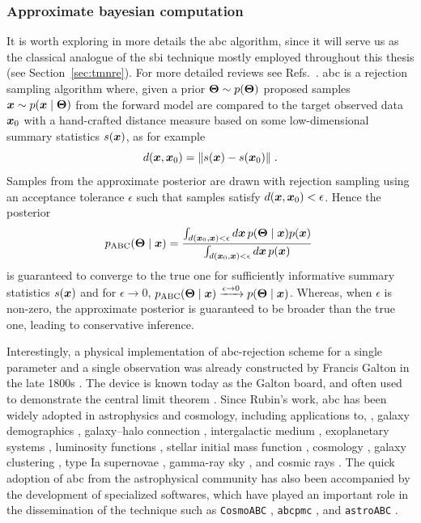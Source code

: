 \subsubsection{Approximate bayesian computation}

It is worth exploring in more details the \gls*{abc} algorithm, since it will serve us as the classical analogue of the \gls*{sbi} technique mostly employed throughout this thesis (see Section~\ref{sec:tmnre}). For more detailed reviews see Refs.~\cite{marin2012approximate, Sisson:2018aa, Grazian:2019aa}. \Gls*{abc} is a rejection sampling algorithm where, given a prior $\bm{\Theta}\sim p(\bm{\Theta})$ proposed samples $\bm{x} \sim p(\bm{x}\mid\bm{\Theta})$ from the forward model are compared to the target observed data $\bm{x}_0$ with a hand-crafted distance measure based on some low-dimensional summary statistics $s(\bm{x})$, as for example
\begin{equation}
    d(\bm{x}, \bm{x}_0)  = \| s(\bm{x}) - s(\bm{x}_0)\|\;.
\end{equation}
Samples from the approximate posterior are drawn with rejection sampling using an acceptance tolerance $\epsilon$ such that samples satisfy $d(\bm{x}, \bm{x}_0) < \epsilon$.
Hence the posterior
\begin{equation}
    p_\text{ABC}(\bm{\Theta}\mid\bm{x}) = \frac
    {\int_{d(\bm{x}_0, \bm{x}) < \epsilon} d\bm{x}\, p(\bm{\Theta}\mid\bm{x})p(\bm{x})}
    {\int_{d(\bm{x}_0, \bm{x}) < \epsilon} d\bm{x}\, p(\bm{x})} \;
\end{equation}
is guaranteed to converge to the true one for sufficiently informative summary statistics $s(\bm{x})$ and for $\epsilon \to 0$, $p_\text{ABC}(\bm{\Theta}\mid\bm{x}) \xrightarrow{\epsilon \to 0} p(\bm{\Theta}\mid\bm{x})$. Whereas, when $\epsilon$ is non-zero, the approximate posterior is guaranteed to be broader than the true one, leading to conservative inference. 

Interestingly, a physical implementation of \gls*{abc}-rejection scheme for a single parameter and a single observation was already constructed by Francis Galton in the late 1800s \cite[Figure 5]{stigler2010darwin}. The device is known today as the Galton board, and often used to demonstrate the central limit theorem \cite{galton1889natural}. Since Rubin's work, \gls*{abc} has been widely adopted in astrophysics and cosmology, including applications to, \eg, galaxy demographics \cite{cameron2012approximate}, galaxy–halo connection \cite{hahn2017approximate}, intergalactic medium \cite{Davies:2017eir}, exoplanetary systems \cite{hsu2018improving}, luminosity functions \cite{Riechers:2018zjg}, stellar initial mass function \cite{cisewski2019preferential}, cosmology \cite{Akeret:2015uha, jennings2017astroabc}, galaxy clustering \cite{Ishida:2015wla}, type Ia supernovae \cite{Weyant:2012xe}, gamma-ray sky \cite{Baxter:2021tui}, and cosmic rays \cite{bourriche2024beyond}. The quick adoption of \gls*{abc} from the astrophysical community has also been accompanied by the development of specialized softwares, which have played an important role in the dissemination of the technique such as \texttt{CosmoABC} \cite{Ishida:2015wla}, \texttt{abcpmc} \cite{Akeret:2015uha}, and \texttt{astroABC} \cite{jennings2017astroabc}.


